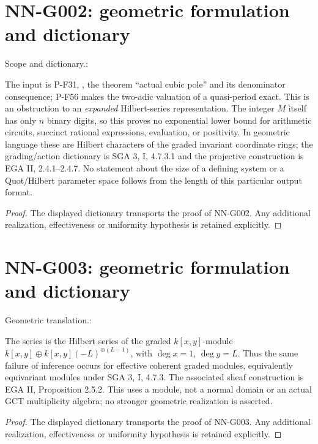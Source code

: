 \section{NN-G002: geometric formulation and dictionary}
\begin{geometricstatement}[NN-G002]
Scope and dictionary.:

The input is P-F31, ,
the theorem ``actual cubic pole'' and its denominator consequence;
P-F56 makes the two-adic valuation of a quasi-period exact. This is
an obstruction to an \emph{expanded} Hilbert-series representation.
The integer $M$ itself has only $n$ binary digits, so this proves no
exponential lower bound for arithmetic circuits, succinct rational
expressions, evaluation, or positivity. In geometric language these
are Hilbert characters of the graded invariant coordinate rings;
the grading/action dictionary is SGA 3, I, 4.7.3.1 and the projective
construction is EGA II, 2.4.1--2.4.7. No statement about the size of
a defining system or a Quot/Hilbert parameter space follows from
the length of this particular output format.


\end{geometricstatement}
\begin{proof} The displayed dictionary transports the proof of NN-G002. Any additional realization, effectiveness or uniformity hypothesis is retained explicitly.\end{proof}


\section{NN-G003: geometric formulation and dictionary}
\begin{geometricstatement}[NN-G003]
Geometric translation.:

The series is the Hilbert series of the graded
$k[x,y]$-module
$k[x,y]\oplus k[x,y](-L)^{\oplus(L-1)}$, with
$\deg x=1$, $\deg y=L$. Thus the same failure of inference occurs
for effective coherent graded modules, equivalently equivariant
modules under SGA 3, I, 4.7.3. The associated sheaf construction is
EGA II, Proposition 2.5.2. This uses a module, not a normal domain
or an actual GCT multiplicity algebra; no stronger geometric
realization is asserted.


\end{geometricstatement}
\begin{proof} The displayed dictionary transports the proof of NN-G003. Any additional realization, effectiveness or uniformity hypothesis is retained explicitly.\end{proof}


